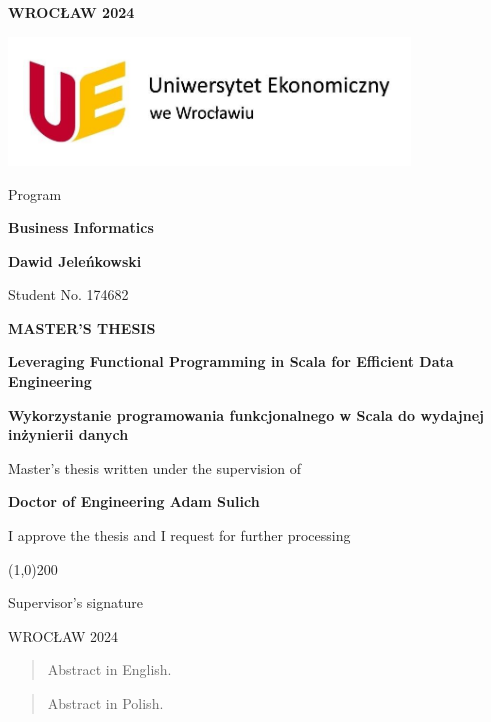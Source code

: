 


\begin{titlepage}
\begin{center}
\textbf{WROCŁAW 2024}

\vspace{0cm}
\includegraphics[width=0.8\textwidth]{uewroc.jpg}

\vspace{0cm}
Program

\textbf{Business Informatics}

\vspace{0cm}
{\Large \textbf{Dawid Jeleńkowski}}

Student No. 174682

\vspace{1cm}
\textbf{MASTER’S THESIS}

\vspace{1cm}
{\huge \textbf{Leveraging Functional Programming in Scala for Efficient Data Engineering}}

\textbf{Wykorzystanie programowania funkcjonalnego w Scala do wydajnej inżynierii danych}

\vspace{2cm}
Master’s thesis written under the supervision of

{\Large \textbf{Doctor of Engineering Adam Sulich}}

\vspace{1cm}
I approve the thesis and I request for further processing

\vspace{0cm}
\line(1,0){200}

Supervisor’s signature

\vspace{0cm}
WROCŁAW 2024
\end{center}
\end{titlepage}

\begin{abstract}
Abstract in English.
\end{abstract}

\begin{abstract}
Abstract in Polish.
\end{abstract}

